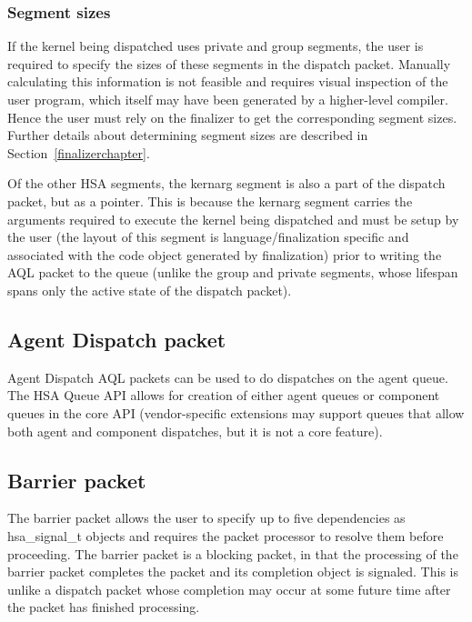 \documentclass[final]{book}
\newcommand{\mariotodo}[1]{\todo[color=CarnationPink]{#1}}
\newcommand{\reftyp}[1]{#1}
\begin{document}
\hypertarget{segment-sizes}{}\subsubsection{Segment sizes}
\label{segment-sizes}

If the kernel being dispatched uses private and group segments, the user is
required to specify the sizes of these segments in the dispatch
packet. Manually calculating this information is not feasible and requires
visual inspection of the user program, which itself may have been generated by a
higher-level compiler. Hence the user must rely on the finalizer to get the
corresponding segment sizes. Further details about determining segment sizes are
described in Section~\ref{finalizerchapter}.

Of the other HSA segments, the kernarg segment is also a part of the dispatch
packet, but as a pointer. This is because the kernarg segment carries the
arguments required to execute the kernel being dispatched and must be setup by
the user (the layout of this segment is language/finalization specific and
associated with the code object generated by finalization) prior to writing the
AQL packet to the queue (unlike the group and private segments, whose lifespan
spans only the active state of the dispatch packet). %

\hypertarget{agent-packet}{}\subsection{Agent Dispatch packet}
\label{agent-packet}

Agent Dispatch AQL packets can be used to do dispatches on the agent queue. The
HSA Queue API allows for creation of either agent queues or component queues in
the core API (vendor-specific extensions may support queues that allow both
agent and component dispatches, but it is not a core feature).

\hypertarget{barrier-packet}{}\subsection{Barrier packet}
\label{barrier-packet}

The barrier packet allows the user to specify up to five dependencies as
\reftyp{hsa_signal_t} objects and requires the packet processor to resolve them
before proceeding. The barrier packet is a blocking packet, in that the
processing of the barrier packet completes the packet and its completion object
is signaled. This is unlike a dispatch packet whose completion may occur at some
future time after the packet has finished processing.
\end{document}
